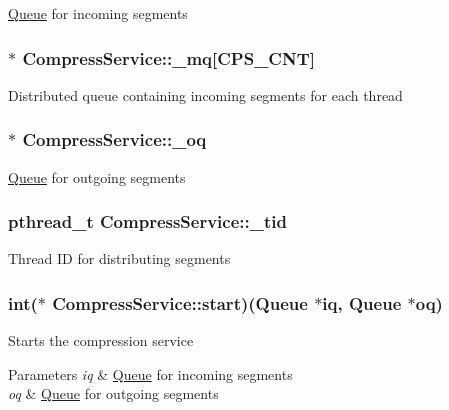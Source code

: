 \hyperlink{structQueue}{\-Queue} for incoming segments \hypertarget{structCompressService_a3153dd0416c747d474480d83d23d3d76}{
\subsubsection[{\-\_\-mq}]{$\ast$ {\bf \-Compress\-Service\-::\-\_\-mq}\mbox{[}{\bf \-C\-P\-S\-\_\-\-C\-N\-T}\mbox{]}}}\label{structCompressService_a3153dd0416c747d474480d83d23d3d76}
\-Distributed queue containing incoming segments for each thread \hypertarget{structCompressService_a776fb7eb7b634352f27e24cd621d5667}{
\subsubsection[{\-\_\-oq}]{$\ast$ {\bf \-Compress\-Service\-::\-\_\-oq}}}\label{structCompressService_a776fb7eb7b634352f27e24cd621d5667}
\hyperlink{structQueue}{\-Queue} for outgoing segments \hypertarget{structCompressService_ac4bdc8605d790886af89c35f63b3cf30}{
\subsubsection[{\-\_\-tid}]{\setlength{\rightskip}{0pt plus 5cm}pthread\-\_\-t {\bf \-Compress\-Service\-::\-\_\-tid}}}\label{structCompressService_ac4bdc8605d790886af89c35f63b3cf30}
\-Thread \-I\-D for distributing segments \hypertarget{structCompressService_adfdf8ef15576011f859f36a69f77ace5}{
\subsubsection[{start}]{\setlength{\rightskip}{0pt plus 5cm}int($\ast$ {\bf \-Compress\-Service\-::start})({\bf \-Queue} $\ast$iq, {\bf \-Queue} $\ast$oq)}}\label{structCompressService_adfdf8ef15576011f859f36a69f77ace5}
\-Starts the compression service 
\begin{DoxyParams}{\-Parameters}
{\em iq} & \hyperlink{structQueue}{\-Queue} for incoming segments \\
\hline
{\em oq} & \hyperlink{structQueue}{\-Queue} for outgoing segments \\
\hline
\end{DoxyParams}
